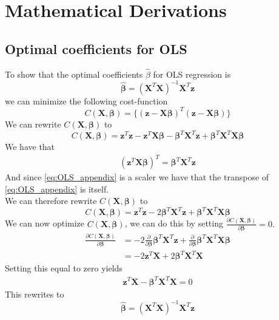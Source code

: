 \documentclass{article}
\begin{document}
\section{Mathematical Derivations}
\label{app:derivations}

\subsection{Optimal coefficients for OLS}
\label{app_derivations:beta_ols_without_svd}
To show that the optimal coefficients $\hat{\beta}$ for OLS regression is 
$$\bm{\hat{\beta}} = (\mathbf{X}^{T}\mathbf{X})^{-1}\mathbf{X}^{T}\bm{z}$$ 
we can minimize the following cost-function
$$C(\mathbf{X}, \bm{\beta}) = \{(\bm{z} - \mathbf{X}\bm{\beta})^{T}(\bm{z} - \mathbf{X}\bm{\beta})\}$$
We can rewrite $C(\mathbf{X}, \bm{\beta})$ to 
$$C(\mathbf{X}, \bm{\beta}) = \bm{z}^{T}\bm{z} - \bm{z}^{T}\mathbf{X}\bm{\beta} - \bm{\beta}^{T}\mathbf{X}^{T}\bm{z} + \bm{\beta}^{T}\mathbf{X}^{T}\mathbf{X}\bm{\beta}$$
We have that
\begin{align} \label{eq:OLS_appendix}
    (\bm{z}^{T}\mathbf{X}\bm{\beta})^{T} = \bm{\beta}^{T}\mathbf{X}^{T}\bm{z}  
\end{align}
And since \ref{eq:OLS_appendix} is a scaler we have that the transpose of \ref{eq:OLS_appendix} is itself. \\
We can therefore rewrite $C(\mathbf{X}, \bm{\beta})$ to
$$C(\mathbf{X}, \bm{\beta}) = \bm{z}^{T}\bm{z} - 2\bm{\beta}^{T}\mathbf{X}^{T}\bm{z} + \bm{\beta}^{T}\mathbf{X}^{T}\mathbf{X}\bm{\beta}$$
We can now optimize $C(\mathbf{X}, \bm{\beta})$, we can do this by setting $\frac{\partial C(\mathbf{X}, \bm{\beta})}{\partial \bm{\beta}} = 0.$
\begin{align*}
    \frac{\partial C(\mathbf{X}, \bm{\beta})}{\partial \bm{\beta}} &= -2\frac{\partial}{\partial\bm{\beta}}  \bm{\beta}^{T}\mathbf{X}^{T}\bm{z} +  \frac{\partial}{\partial \bm{\beta}} \bm{\beta}^{T}\mathbf{X}^{T}\mathbf{X}\bm{\beta} \\
    &= -2\bm{z}^{T}\mathbf{X} + 2\bm{\beta}^{T}\mathbf{X}^{T}\mathbf{X} 
\end{align*}
Setting this equal to zero yields
\begin{align*}
    \bm{z}^{T}\mathbf{X} - \bm{\beta}^{T}\mathbf{X}^{T}\mathbf{X} = 0
\end{align*}
This rewrites to
$$\bm{\hat{\beta}} = (\mathbf{X}^{T}\mathbf{X})^{-1}\mathbf{X}^{T}\bm{z}$$ 
\end{document}
